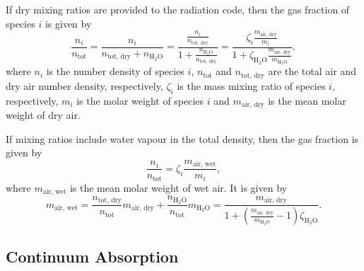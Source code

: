 If dry mixing ratios are provided to the radiation code, then the gas
fraction of species $i$ is given by
\begin{equation}
\frac{n_i}{n_\text{tot}}
=\frac{n_i}{n_\text{tot, dry} + n_\text{H$_2$O}}
=\frac{\frac{n_i}{n_\text{tot, dry}}}
{1 + \frac{n_\text{H$_2$O}}{n_\text{tot, dry}}}
=\frac{\zeta_i \frac{m_\text{air, dry}}{m_i}}{1 + \zeta_\text{H$_2$O}
\frac{m_\text{air, dry}}{m_\text{H$_2$O}}},
\end{equation}
%
where $n_i$ is the number density of species $i$, $n_\text{tot}$ and
$n_\text{tot, dry}$ are the total air and dry air number density,
respectively, $\zeta_i$ is the mass mixing ratio
of species $i$, respectively, $m_i$ is the molar weight of species $i$
and $m_\text{air, dry}$ is the mean molar weight of dry air.

If mixing ratios include water vapour in the total density, then the
gas fraction is given by
\begin{equation}
\frac{n_i}{n_\text{tot}} =
\zeta_i \frac{m_\text{air, wet}}{m_i},
\end{equation}
%
where $m_\text{air, wet}$ is the mean molar weight of wet air. It is
given by
\begin{equation}
m_\text{air, wet}
=\frac{n_\text{tot, dry}}{n_\text{tot}} m_\text{air, dry}
+\frac{n_\text{H$_2$O}}{n_\text{tot}} m_\text{H$_2$O}
=\frac{m_\text{air, dry}}{1
+\left( \frac{m_\text{air, dry}}{m_\text{H$_2$O}} - 1 \right)
\zeta_\text{H$_2$O}} .
\end{equation}

\subsection{Continuum Absorption}

